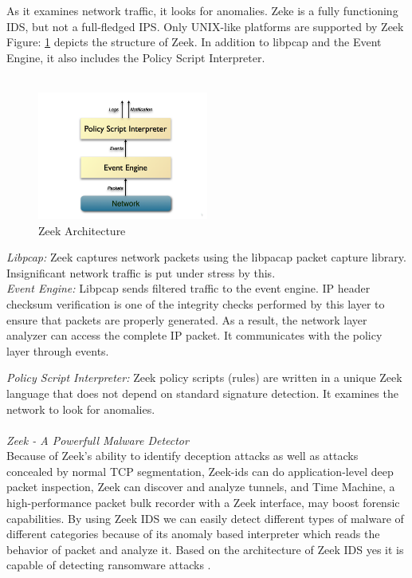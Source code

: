 As it examines network traffic, it looks for anomalies. Zeke is a fully functioning IDS, but not a full-fledged IPS. Only UNIX-like platforms are supported by Zeek Figure: \ref{fig:zeek_architecture} depicts the structure of Zeek. In addition to libpcap and the Event Engine, it also includes the Policy Script Interpreter.\\ 
\\
\begin{figure}[h]
    \centering
    \includegraphics[width=0.5\textwidth]{images/zeek_architecture.png}
    \caption{Zeek Architecture \cite{Zeek2019}}
    \label{fig:zeek_architecture}
\end{figure}


\textit{Libpcap:} Zeek captures network packets using the libpacap packet capture library. Insignificant network traffic \cite{SHIMEALL2014253} is put under stress by this. 
\\
\textit{Event Engine:} Libpcap sends filtered traffic to the event engine. IP header checksum verification is one of the integrity checks performed by this layer to ensure that packets are properly generated. As a result, the network layer analyzer can access the complete IP packet. It communicates with the policy layer through events. 

\textit{Policy Script Interpreter:} Zeek policy scripts (rules) are written in a unique Zeek language that does not depend on standard signature detection. It examines the network to look for anomalies.\\
\\
\textit{Zeek - A Powerfull Malware Detector}
\\
Because of Zeek's ability to identify deception attacks as well as attacks concealed by normal TCP segmentation, Zeek-ids can do application-level deep packet inspection, Zeek can discover and analyze tunnels, and Time Machine, a high-performance packet bulk recorder with a Zeek interface, may boost forensic capabilities.  By using Zeek IDS we can easily detect different types of malware of different categories because of its anomaly based interpreter which reads the behavior of packet and analyze it.  Based on the architecture of Zeek IDS yes it is capable of detecting ransomware attacks \cite{Bhosale2015}. 

